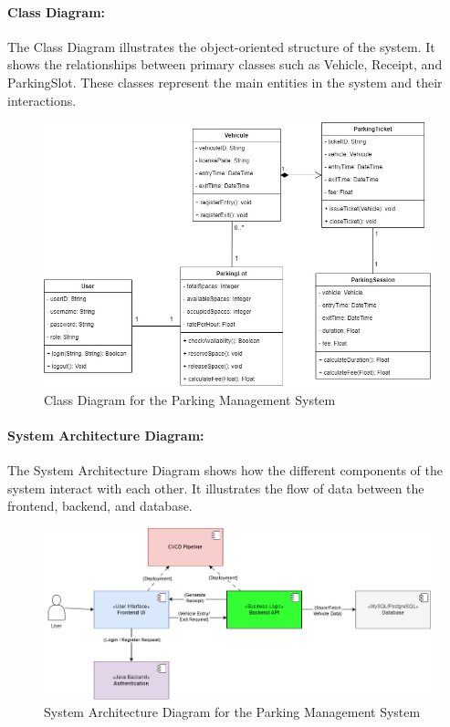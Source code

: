 \paragraph{Class Diagram:}
The Class Diagram illustrates the object-oriented structure of the system. It shows the relationships between primary classes such as Vehicle, Receipt, and ParkingSlot. These classes represent the main entities in the system and their interactions.

\begin{figure}[ht]
    \centering
    \includegraphics[width=0.8\linewidth]{methods/images/Class_Diagram_Parkinglot_System.jpg}
    \caption{Class Diagram for the Parking Management System}
\end{figure}

\paragraph{System Architecture Diagram:}
The System Architecture Diagram shows how the different components of the system interact with each other. It illustrates the flow of data between the frontend, backend, and database.

\begin{figure}[ht]
    \centering
    \includegraphics[width=0.8\linewidth]{methods/images/Parking_Management_System_Architecture.png}
    \caption{System Architecture Diagram for the Parking Management System}
\end{figure}

